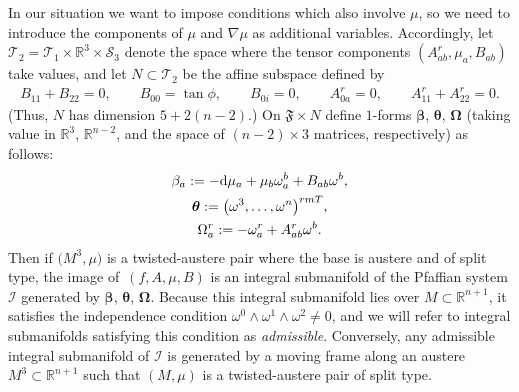 \documentclass[10pt,a4paper]{amsart}
\def\R{\mathbb{R}}
\def\vOmega{\boldsymbol{\Omega}}
\def\vbeta{\boldsymbol{\beta}}
\def\vtheta{\boldsymbol{\theta}}
\def\vOmega{\boldsymbol{\Omega}}
\def\calS{\mathcal{S}}
\def\calT{\mathcal{T}}
\def\F{\mathfrak{F}}
\def\calI{\mathcal{I}}
\def\w{\omega}
\numberwithin{equation}{section}
\begin{document}
In our situation we want to impose conditions which also involve $\mu$, so we need to introduce the components of $\mu$ and $\nabla \mu$ as additional variables. Accordingly, let $\calT_2 = \calT_1 \times \R^3 \times \calS_3$ denote the space where the tensor components $(A^r_{ab}, \mu_a, B_{ab})$ take values, and let $N \subset \calT_2$ be the affine subspace defined by
\begin{gather} \label{splitedseqns}
B_{11}+B_{22}=0, \qquad
B_{00}=\tan\phi, \qquad
B_{0i}=0,\qquad
A^r_{0a}=0, \qquad
A^r_{11}+A^r_{22}=0.
\end{gather}
(Thus, $N$ has dimension $5+2(n-2)$.) On $\F \times N$ define $1$-forms $\vbeta$, $\vtheta$, $\vOmega$
(taking value in $\R^3$, $\R^{n-2}$, and the space of $(n-2)\times 3$ matrices, respectively) as follows:
\begin{subequations} \label{bigsysdef}
\begin{gather}
\beta_a := -{\rm d}\mu_a + \mu_b \w^b_a + B_{ab} \w^b,
\label{betadef} \\
\vtheta := \big(\w^3, \dots, \w^n\big)^{rm T}, \label{vthetadef}
\\
\Omega^r_a := -\w^r_a + A^r_{ab} \w^b. \label{Omegaradef}
\end{gather}
\end{subequations}
Then if $\big(M^3,\mu\big)$ is a twisted-austere pair where the base is austere and of split type, the image of~$(f,A,\mu,B)$ is an integral submanifold of the Pfaffian system $\calI$ generated by $\vbeta$, $\vtheta$, $\vOmega$. Because this integral submanifold lies over $M \subset \R^{n+1}$, it satisfies the independence condition $\w^0 \wedge \w^1 \wedge \w^2\ne 0$, and we will refer to integral submanifolds satisfying this condition as {\em admissible}. Conversely, any admissible integral submanifold of $\calI$ is generated by a moving frame along an austere $M^3 \subset \R^{n+1}$ such that $(M,\mu)$ is a twisted-austere pair of split type.
\end{document}
